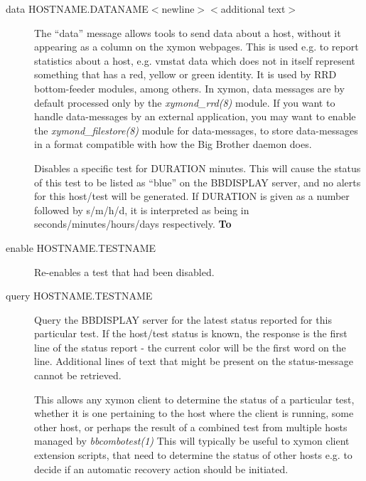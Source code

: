 \begin{description}
 

\item[data HOSTNAME.DATANAME$<$newline$>$$<$additional text$>$] The
 ``data'' message allows tools to send data about a host, without it
 appearing as a column on the xymon webpages. This is used e.g. to
 report statistics about a host, e.g. vmstat data which does not in
 itself represent something that has a red, yellow or green
 identity. It is used by RRD bottom-feeder modules, among others. In
 xymon, data messages are by default processed only by the
 \emph{xymond\_rrd(8)} module. If you want to handle data-messages by
 an external application, you may want to enable the
 \emph{xymond\_filestore(8)}  module for data-messages, to store
 data-messages in a format compatible with how the Big Brother daemon
 does. 


 Disables a specific test for DURATION minutes. This will cause the
 status of this test to be listed as ``blue'' on the BBDISPLAY server,
 and no alerts for this host/test will be generated. If DURATION is
 given as a number followed by s/m/h/d, it is interpreted as being in
 seconds/minutes/hours/days respectively. \textbf{To} 



\item[enable HOSTNAME.TESTNAME] Re-enables a test that had been disabled. 

 

\item[query HOSTNAME.TESTNAME] Query the BBDISPLAY server for the
  latest status reported for this particular test. If the host/test
  status is known, the response is the first line of the status report
  - the current color will be the first word on the line. Additional
  lines of text that might be present on the status-message cannot be
  retrieved.  

 This allows any xymon client to determine the status of a particular
 test, whether it is one pertaining to the host where the client is
 running, some other host, or perhaps the result of a combined test
 from multiple hosts managed by \emph{bbcombotest(1)} This will
 typically be useful to xymon client extension scripts, that need to
 determine the status of other hosts e.g. to decide if an automatic
 recovery action should be initiated. 



\end{description}
